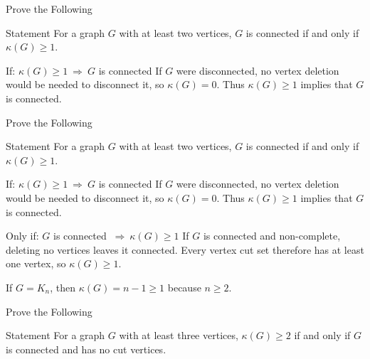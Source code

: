 \documentclass[aspectratio=169,11pt]{beamer}
\begin{document}
	\begin{frame}[t]{Prove the Following}
		\vspace{0.15cm}
		\begin{block}{Statement}
			For a graph $G$ with at least two vertices, $G$ is connected if and only if $\kappa(G)\geq 1$.
		\end{block}
		\vspace{0.3cm}
		\begin{block}{If: $\kappa(G)\geq 1\ \Longrightarrow\ G$ is connected}
			If $G$ were disconnected, no vertex deletion would be needed to disconnect it, so $\kappa(G)=0$. Thus $\kappa(G)\geq 1$ implies that $G$ is connected.
		\end{block}
	\end{frame}
	
	\begin{frame}[t]{Prove the Following}
		\vspace{0.15cm}
		\begin{block}{Statement}
			For a graph $G$ with at least two vertices, $G$ is connected if and only if $\kappa(G)\geq 1$.
		\end{block}
		\vspace{0.3cm}
		\begin{block}{If: $\kappa(G)\geq 1\ \Longrightarrow\ G$ is connected}
			If $G$ were disconnected, no vertex deletion would be needed to disconnect it, so $\kappa(G)=0$. Thus $\kappa(G)\geq 1$ implies that $G$ is connected.
		\end{block}
		\vspace{0.3cm}
		\begin{block}{Only if: $G$ is connected $\ \Longrightarrow\ \kappa(G)\geq 1$}
			If $G$ is connected and non-complete, deleting no vertices leaves it connected. Every vertex cut set therefore has at least one vertex, so $\kappa(G)\geq 1$.
			
			\medskip
			If $G=K_n$, then $\kappa(G)=n-1\geq 1$ because $n\geq 2$.
		\end{block}
	\end{frame}
	
	\begin{frame}[t]{Prove the Following}
		\small
		\vspace{0.15cm}
		\begin{block}{Statement}
			For a graph $G$ with at least three vertices, $\kappa(G)\geq 2$ if and only if $G$ is connected and has no cut vertices.
		\end{block}
	\end{frame}
	
\end{document}
